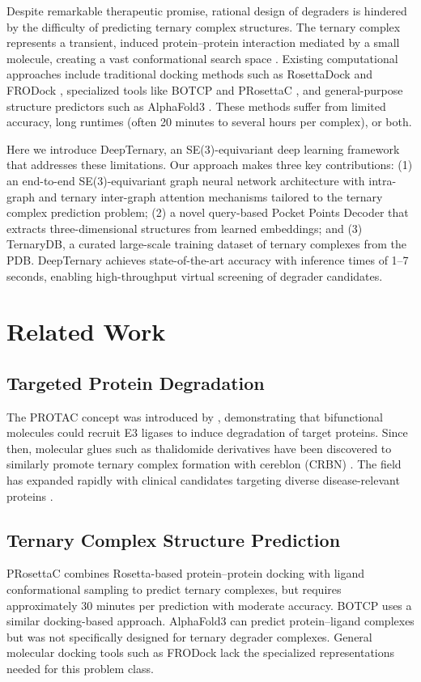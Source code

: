\documentclass[11pt]{article}
\begin{document}
Despite remarkable therapeutic promise, rational design of degraders is hindered by the difficulty of predicting ternary complex structures. The ternary complex represents a transient, induced protein--protein interaction mediated by a small molecule, creating a vast conformational search space \citep{schiemer2021}. Existing computational approaches include traditional docking methods such as RosettaDock \citep{gray2003} and FRODock \citep{ramirez2009}, specialized tools like BOTCP \citep{bai2021} and PRosettaC \citep{zaidman2020}, and general-purpose structure predictors such as AlphaFold3 \citep{abramson2024}. These methods suffer from limited accuracy, long runtimes (often 20 minutes to several hours per complex), or both.

Here we introduce DeepTernary, an SE(3)-equivariant deep learning framework that addresses these limitations. Our approach makes three key contributions: (1) an end-to-end SE(3)-equivariant graph neural network architecture with intra-graph and ternary inter-graph attention mechanisms tailored to the ternary complex prediction problem; (2) a novel query-based Pocket Points Decoder that extracts three-dimensional structures from learned embeddings; and (3) TernaryDB, a curated large-scale training dataset of ternary complexes from the PDB. DeepTernary achieves state-of-the-art accuracy with inference times of 1--7 seconds, enabling high-throughput virtual screening of degrader candidates.

\section{Related Work}

\subsection{Targeted Protein Degradation}
The PROTAC concept was introduced by \citet{sakamoto2001}, demonstrating that bifunctional molecules could recruit E3 ligases to induce degradation of target proteins. Since then, molecular glues such as thalidomide derivatives have been discovered to similarly promote ternary complex formation with cereblon (CRBN) \citep{ito2010}. The field has expanded rapidly with clinical candidates targeting diverse disease-relevant proteins \citep{pettersson2019}.

\subsection{Ternary Complex Structure Prediction}
PRosettaC \citep{zaidman2020} combines Rosetta-based protein--protein docking with ligand conformational sampling to predict ternary complexes, but requires approximately 30 minutes per prediction with moderate accuracy. BOTCP \citep{bai2021} uses a similar docking-based approach. AlphaFold3 \citep{abramson2024} can predict protein--ligand complexes but was not specifically designed for ternary degrader complexes. General molecular docking tools such as FRODock \citep{ramirez2009} lack the specialized representations needed for this problem class.
\end{document}
